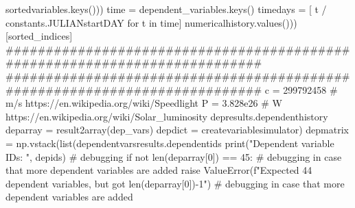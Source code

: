 {}sortedvariables.keys()))\markdownRendererInterblockSeparator
{}
\markdownRendererSectionEnd \markdownRendererSectionBegin
{}\markdownRendererInterblockSeparator
{}
\markdownRendererSectionEnd \markdownRendererSectionBegin
{}\markdownRendererInterblockSeparator
{}time = dependent_variables.keys()\markdownRendererInterblockSeparator
{}
\markdownRendererSectionEnd \markdownRendererSectionBegin
{}\markdownRendererInterblockSeparator
{}timedays = [ t / constants.JULIANstartDAY for t in time]\markdownRendererInterblockSeparator
{}
\markdownRendererSectionEnd \markdownRendererSectionBegin
{}\markdownRendererInterblockSeparator
{}numericalhistory.values()))[sorted_indices]\markdownRendererInterblockSeparator
{}###########################################################################\markdownRendererInterblockSeparator
{}
\markdownRendererSectionEnd \markdownRendererSectionBegin
{}\markdownRendererInterblockSeparator
{}########################################################################### c = 299792458 # m/s https://en.wikipedia.org/wiki/Speedlight P = 3.828e26 # W https://en.wikipedia.org/wiki/Solar_luminosity\markdownRendererInterblockSeparator
{}
\markdownRendererSectionEnd \markdownRendererSectionBegin
{}\markdownRendererInterblockSeparator
{}depresults.dependenthistory deparray = result2array(dep_vars)\markdownRendererInterblockSeparator
{}
\markdownRendererSectionEnd \markdownRendererSectionBegin
{}\markdownRendererInterblockSeparator
{}depdict = createvariablesimulator) depmatrix = np.vstack(list(dependentvarsresults.dependentids print("Dependent variable IDs: ", depids) # debugging if not len(deparray[0]) == 45: # debugging in case that more dependent variables are added raise ValueError(f"Expected 44 dependent variables, but got {len(deparray[0])-1}") # debugging in case that more dependent variables are added\markdownRendererInterblockSeparator
